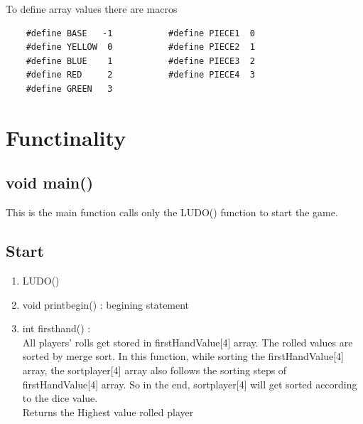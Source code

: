 \documentclass{article}
\begin{document}


To define array values there are macros 
\begin{verbatim}
    #define BASE   -1           #define PIECE1  0
    #define YELLOW  0           #define PIECE2  1
    #define BLUE    1           #define PIECE3  2
    #define RED     2           #define PIECE4  3
    #define GREEN   3
\end{verbatim}

\section{Functinality}
\subsection{void main()}
This is the main function calls only the LUDO() function to start the game.

\subsection{Start}
\justify
\begin{enumerate}
    \item {LUDO()}
    \item {void printbegin()} : begining statement
    \item {int firsthand()}   :\\

All players' rolls get stored in firstHandValue[4] array. The rolled values are sorted by merge sort. In this function, while sorting the firstHandValue[4] array, the sortplayer[4] array also follows the sorting steps of firstHandValue[4] array. So in the end, sortplayer[4] will get sorted according to the dice value.\\
Returns the Highest value rolled player   
\end{enumerate}
\end{document}
